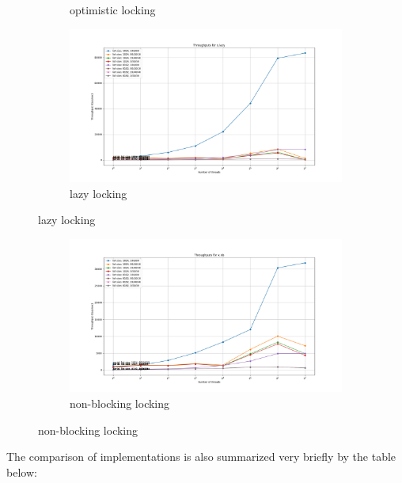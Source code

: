 \documentclass{article}
\newcommand{\eng}[1]{#1}
\begin{document}
\begin{figure}[ht]
\begin{subfigure}{0.45\textwidth}
        \caption{\eng{optimistic locking}}
        \label{fig:opt}
    \end{subfigure}
    \begin{subfigure}{0.45\textwidth}
        \includegraphics[width=\textwidth]{a3/plots/lazy.png}
        \caption{\eng{lazy locking}}
        \label{fig:lazy}
    \end{subfigure}
\end{figure}

\begin{figure}
    \centering
    \ContinuedFloat
    \begin{subfigure}{0.8\textwidth}
        \includegraphics[width=\textwidth]{a3/plots/nb.png}
        \caption{\eng{non-blocking locking}}
        \label{fig:nb}
    \end{subfigure}
\end{figure}
\clearpage

The comparison of implementations is also summarized very briefly by the table below:
\end{document}
